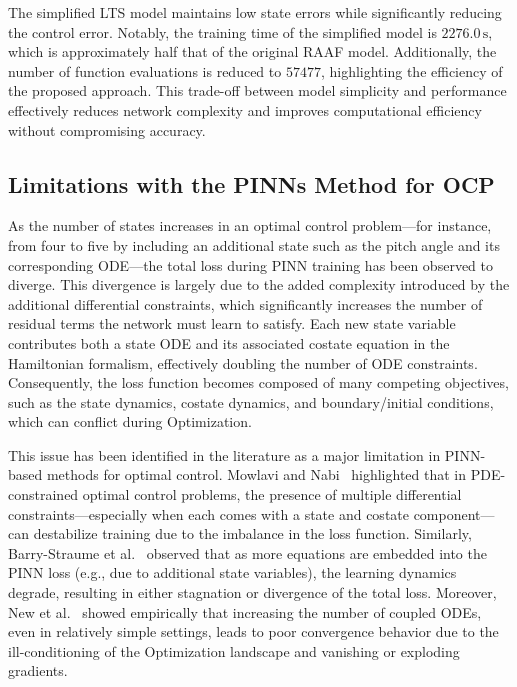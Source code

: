 The simplified LTS model maintains low state errors while significantly reducing the control error. Notably, the training time of the simplified model is \( 2276.0\,\text{s} \), which is approximately half that of the original RAAF model. Additionally, the number of function evaluations is reduced to $57477$, highlighting the efficiency of the proposed approach. This trade-off between model simplicity and performance effectively reduces network complexity and improves computational efficiency without compromising accuracy.


\subsection{Limitations with the PINNs Method for OCP}

As the number of states increases in an optimal control problem—for instance, from four to five by including an additional state such as the pitch angle and its corresponding ODE—the total loss during PINN training has been observed to diverge. This divergence is largely due to the added complexity introduced by the additional differential constraints, which significantly increases the number of residual terms the network must learn to satisfy. Each new state variable contributes both a state ODE and its associated costate equation in the Hamiltonian formalism, effectively doubling the number of ODE constraints. Consequently, the loss function becomes composed of many competing objectives, such as the state dynamics, costate dynamics, and boundary/initial conditions, which can conflict during Optimization.

This issue has been identified in the literature as a major limitation in PINN-based methods for optimal control. Mowlavi and Nabi~\cite{mowlavi2022} highlighted that in PDE-constrained optimal control problems, the presence of multiple differential constraints—especially when each comes with a state and costate component—can destabilize training due to the imbalance in the loss function. Similarly, Barry-Straume et al.~\cite{barry2022controlpinns} observed that as more equations are embedded into the PINN loss (e.g., due to additional state variables), the learning dynamics degrade, resulting in either stagnation or divergence of the total loss. Moreover, New et al.~\cite{new2022} showed empirically that increasing the number of coupled ODEs, even in relatively simple settings, leads to poor convergence behavior due to the ill-conditioning of the Optimization landscape and vanishing or exploding gradients.


